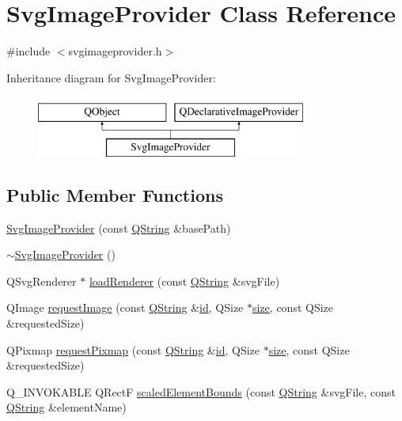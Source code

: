 \hypertarget{class_svg_image_provider}{\section{Svg\-Image\-Provider Class Reference}
\label{class_svg_image_provider}
}


{\ttfamily \#include $<$svgimageprovider.\-h$>$}

Inheritance diagram for Svg\-Image\-Provider\-:\begin{figure}[H]
\begin{center}
\leavevmode
\includegraphics[height=2.000000cm]{class_svg_image_provider}
\end{center}
\end{figure}
\subsection*{Public Member Functions}
\begin{DoxyCompactItemize}
\item 
\hyperlink{group___o_p_map_plugin_ga2b9c3d2098c51db2899a9d98684abb21}{Svg\-Image\-Provider} (const \hyperlink{group___u_a_v_objects_plugin_gab9d252f49c333c94a72f97ce3105a32d}{Q\-String} \&base\-Path)
\item 
\hyperlink{group___o_p_map_plugin_gadd8520789d1a874b7a4074bfafac4ea3}{$\sim$\-Svg\-Image\-Provider} ()
\item 
Q\-Svg\-Renderer $\ast$ \hyperlink{group___o_p_map_plugin_ga86ec36e3e8140373701546a7bbb0460b}{load\-Renderer} (const \hyperlink{group___u_a_v_objects_plugin_gab9d252f49c333c94a72f97ce3105a32d}{Q\-String} \&svg\-File)
\item 
Q\-Image \hyperlink{group___o_p_map_plugin_ga47800a9f6d3722318713988d27fde449}{request\-Image} (const \hyperlink{group___u_a_v_objects_plugin_gab9d252f49c333c94a72f97ce3105a32d}{Q\-String} \&\hyperlink{glext_8h_a58c2a664503e14ffb8f21012aabff3e9}{id}, Q\-Size $\ast$\hyperlink{glext_8h_a014d89bd76f74ef3a29c8f04b473eb76}{size}, const Q\-Size \&requested\-Size)
\item 
Q\-Pixmap \hyperlink{group___o_p_map_plugin_ga8d12637852381c8b3d6682d4bed9e4c7}{request\-Pixmap} (const \hyperlink{group___u_a_v_objects_plugin_gab9d252f49c333c94a72f97ce3105a32d}{Q\-String} \&\hyperlink{glext_8h_a58c2a664503e14ffb8f21012aabff3e9}{id}, Q\-Size $\ast$\hyperlink{glext_8h_a014d89bd76f74ef3a29c8f04b473eb76}{size}, const Q\-Size \&requested\-Size)
\item 
Q\-\_\-\-I\-N\-V\-O\-K\-A\-B\-L\-E Q\-Rect\-F \hyperlink{group___o_p_map_plugin_gaaa6ab880f473fb953480012d1c5b8a73}{scaled\-Element\-Bounds} (const \hyperlink{group___u_a_v_objects_plugin_gab9d252f49c333c94a72f97ce3105a32d}{Q\-String} \&svg\-File, const \hyperlink{group___u_a_v_objects_plugin_gab9d252f49c333c94a72f97ce3105a32d}{Q\-String} \&element\-Name)
\end{DoxyCompactItemize}


